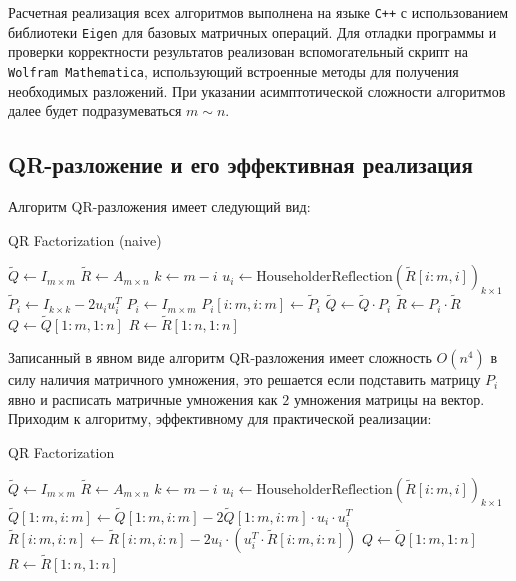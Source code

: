 \documentclass[a4paper,14pt]{extarticle}
\begin{document}
Расчетная реализация всех алгоритмов выполнена на языке \texttt{C++} с использованием библиотеки \texttt{Eigen} для базовых матричных операций. Для отладки программы и проверки корректности результатов реализован вспомогательный скрипт на \texttt{Wolfram Mathematica}, использующий встроенные методы для получения необходимых разложений. При указании асимптотической сложности алгоритмов далее будет подразумеваться $m \sim n$.

\subsection{QR-разложение и его эффективная реализация}

Алгоритм QR-разложения имеет следующий вид:

\begin{algorithm}[H] %
\caption{QR Factorization (naive)}
\vspace{4pt}
$\tilde{Q} \gets I_{m \times m}$\;
$\tilde{R} \gets A_{m \times n}$\;
 {
	$k \gets m - i$\;
	$u_i \gets \mathrm{HouseholderReflection}(\tilde{R}[i:m, i])_{k \times 1}$\;
	$\tilde{P}_i \gets I_{k \times k} - 2 u_i u_i^T$\;
	$P_i \gets I_{m \times m}$\;
	$P_i[i:m, i:m] \gets \tilde{P}_i$\;
	$\tilde{Q} \gets \tilde{Q} \cdot P_i$\;
	$\tilde{R} \gets P_i \cdot \tilde{R}$\;
}
$Q \gets \tilde{Q}[1:m, 1:n]$\;
$R \gets \tilde{R}[1:n, 1:n]$\;
\end{algorithm}
\vspace{8pt}

\noindent Записанный в явном виде алгоритм QR-разложения имеет сложность $O(n^4)$ в силу наличия матричного умножения, это решается если подставить матрицу $P_i$ явно и расписать матричные умножения как $2$ умножения матрицы на вектор. Приходим к алгоритму, эффективному для практической реализации:

\begin{algorithm}[H]
\caption{QR Factorization}
\vspace{4pt}
$\tilde{Q} \gets I_{m \times m}$\;
$\tilde{R} \gets A_{m \times n}$\;
 {
	$k \gets m - i$\;
	$u_i \gets \mathrm{HouseholderReflection}(\tilde{R}[i:m, i])_{k \times 1}$\;
	$\tilde{Q}[1:m, i:m] \gets \tilde{Q}[1:m, i:m] - 2 \tilde{Q}[1:m, i:m] \cdot u_i \cdot u_i^T$\;
	$\tilde{R}[i:m, i:n] \gets \tilde{R}[i:m, i:n] - 2 u_i \cdot (u_i^T \cdot \tilde{R}[i:m, i:n])$\;
}
$Q \gets \tilde{Q}[1:m, 1:n]$\;
$R \gets \tilde{R}[1:n, 1:n]$\;
\end{algorithm}
\vspace{8pt}
\end{document}
